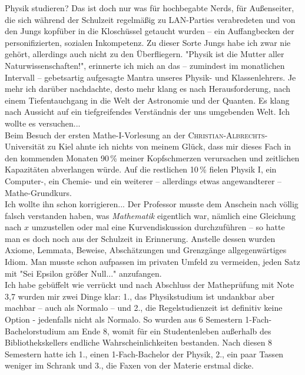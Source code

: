 \begin{multicols*}{2}
Physik studieren? Das ist doch nur was für hochbegabte Nerds, für Außenseiter, die sich während der Schulzeit regelmäßig zu LAN-Parties verabredeten und 
von den  Jungs kopfüber in die Kloschüssel getaucht wurden -- ein Auffangbecken der personifizierten, sozialen Inkompetenz.
Zu dieser Sorte Jungs habe ich zwar nie gehört, allerdings auch nicht zu den Überfliegern.
"Physik ist die Mutter aller Naturwissenschaften!", erinnerte ich mich an das – zumindest im monatlichen Intervall – gebetsartig aufgesagte Mantra unseres
Physik- und Klassenlehrers. Je mehr ich darüber nachdachte, desto mehr klang es nach Herausforderung,
nach einem Tiefentauchgang in die Welt der Astronomie und der Quanten.
Es klang nach Aussicht auf ein tiefgreifendes Verständnis der uns umgebenden Welt. Ich wollte es versuchen... \\ 

Beim Besuch der ersten Mathe-\textsc{I}-Vorlesung an der \textsc{Christian-Albrechts}-Universität zu Kiel ahnte ich nichts von meinem Glück, dass mir dieses Fach in den kommenden Monaten 90\,\% meiner Kopfschmerzen
verursachen und zeitlichen Kapazitäten abverlangen würde.
Auf die restlichen 10\,\% fielen Physik \textsc{I}, ein Computer-, ein Chemie- und ein weiterer – allerdings etwas angewandterer – Mathe-Grundkurs. \\ 

Ich wollte ihn schon korrigieren... Der Professor musste dem Anschein nach völlig falsch verstanden haben, was \textit{Mathematik} eigentlich war,
nämlich eine Gleichung nach $x$ umzustellen oder mal eine Kurvendiskussion durchzuführen – so hatte man es doch noch aus der Schulzeit in Erinnerung.
Anstelle dessen wurden Axiome, Lemmata, Beweise, Abschätzungen und Grenzgänge allgegenwärtiges Idiom.
Man musste schon aufpassen im privaten Umfeld zu vermeiden, jeden Satz mit "Sei Epsilon größer Null..." anzufangen. \\ 

Ich habe gebüffelt wie verrückt und nach Abschluss der Matheprüfung mit Note 3,7 wurden mir zwei Dinge klar: 1., das Physikstudium ist undankbar aber
machbar – auch als Normalo – und 2., die Regelstudienzeit ist definitiv keine Option - jedenfalls nicht als Normalo.
So wurden aus 6 Semestern 1-Fach-Bachelorstudium am Ende 8, womit für ein Studentenleben außerhalb des
Bibliothekskellers endliche Wahrscheinlichkeiten bestanden. Nach diesen 8 Semestern hatte ich 1., einen 1-Fach-Bachelor der Physik, 2., ein paar Tassen weniger im
Schrank und 3., die Faxen von der Materie erstmal dicke. \\ 


\end{multicols*}
